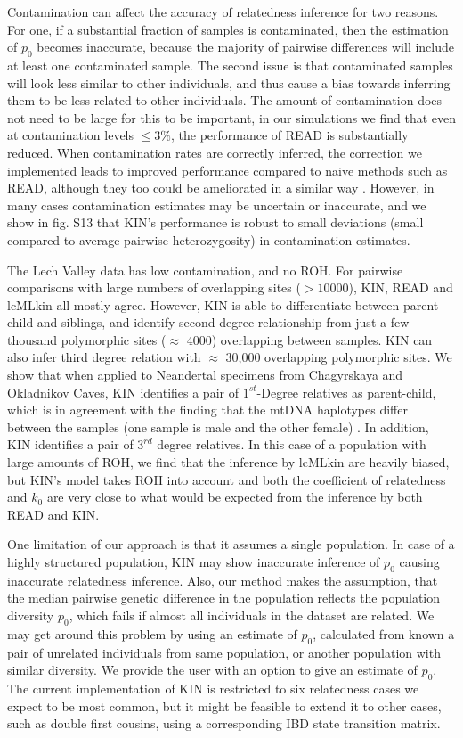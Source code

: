 \documentclass[12pt, letterpaper]{article}
\begin{document}
Contamination can affect the accuracy of relatedness inference for two reasons. For one, if a substantial fraction of samples is contaminated, then the estimation of $p_0$ becomes inaccurate, because the majority of pairwise differences will include at least one contaminated sample. The second issue is that contaminated samples will look less similar to other individuals, and thus cause a bias towards inferring them to be less related to other individuals. The amount of contamination does not need to be large for this to be important, in our simulations we find that even at contamination levels $\leq 3\%$, the performance of READ is substantially reduced. When contamination rates are correctly inferred, the correction we implemented leads to improved performance compared to naive methods such as READ, although they too could be ameliorated in a similar way \cite{skov_genetic_2022}. However, in many cases contamination estimates may be uncertain or inaccurate, and we show in fig. S13 that KIN's performance is robust to small deviations (small compared to average pairwise heterozygosity) in contamination estimates.

The Lech Valley data has low contamination, and no ROH. For pairwise comparisons with large numbers of overlapping sites ($>10000$), KIN, READ and lcMLkin all mostly agree. However, KIN is able to differentiate between parent-child and siblings, and identify second degree relationship from just a few thousand polymorphic sites ($\approx$ 4000) overlapping between samples. KIN can also infer third degree relation with $\approx$ 30,000 overlapping polymorphic sites. We show that when applied to Neandertal specimens from Chagyrskaya and Okladnikov Caves, KIN identifies a pair of $1^{st}$-Degree relatives as parent-child, which is in agreement with the finding that the mtDNA haplotypes differ between the samples (one sample is male and the other female) \cite{skov_genetic_2022}. In addition, KIN identifies a pair of $3^{rd}$ degree relatives. In this case of a population with large amounts of ROH, we find that the inference by lcMLkin are heavily biased, but KIN's model takes ROH into account and both the coefficient of relatedness and $k_0$ are very close to what would be expected from the inference by both READ and KIN.

One limitation of our approach is that it assumes a single population. In case of a highly structured population, KIN may show inaccurate inference of $p_0$ causing inaccurate relatedness inference. Also, our method makes the assumption, that the median pairwise genetic difference in the population reflects the population diversity $p_0$, which fails if almost all individuals in the dataset are related. We may get around this problem by using an estimate of $p_0$, calculated from known a pair of unrelated individuals from same population, or another population with similar diversity. We provide the user with an option to give an estimate of $p_0$. The current implementation of KIN is restricted to six relatedness cases we expect to be most common, but it might be feasible to extend it to other cases, such as double first cousins, using a corresponding IBD state transition matrix.
\end{document}
